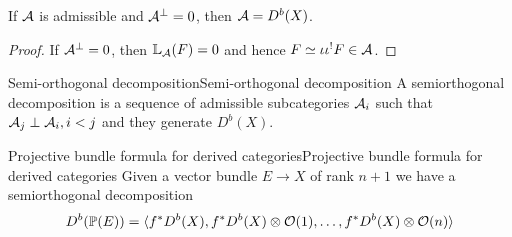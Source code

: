 \begin{corollary}{}{}
    If $\mathcal{A}$ is admissible and $\mathcal{A}^\perp=0$, then $\mathcal{A}=D^b(X)$.
\end{corollary}

\begin{proof}
    If $\mathcal{A}^\perp=0$, then $\mathbb{L}_{\mathcal{A}}(F)=0$ and hence $F\simeq \iota \iota^! F\in \mathcal{A}$.
\end{proof}


\begin{definition}{Semi-orthogonal decomposition}{Semi-orthogonal decomposition}
    A semiorthogonal decomposition is a sequence of admissible subcategories $\mathcal{A}_{i}$ such that $\mathcal{A}_{j}\perp \mathcal{A}_{i}, i<j$ and they generate $D^b(X)$.
\end{definition}


\begin{proposition}{Projective bundle formula for derived categories}{Projective bundle formula for derived categories}
    Given a vector bundle $E\to X$ of rank $n+1$ we have a semiorthogonal decomposition
    \begin{equation*}
        D^b(\mathbb{P}(E)) = \langle f^*D^b(X),f^*D^b(X)\otimes\mathcal{O}(1),\ldots,f^*D^b(X)\otimes\mathcal{O}(n)\rangle
    \end{equation*}
\end{proposition}

